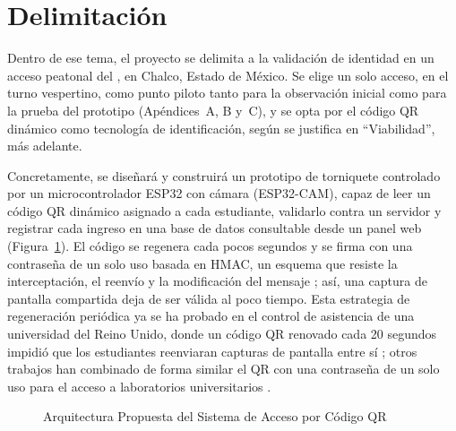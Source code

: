 \section{Delimitación}
Dentro de ese tema, el proyecto se delimita a la validación de identidad en
un acceso peatonal del \tescha{},
en Chalco, Estado de México. Se elige un solo acceso, en el turno vespertino,
como punto piloto tanto para la observación inicial como para la prueba del
prototipo (Apéndices~A, B y~C), y se opta por el código QR dinámico como
tecnología de identificación, según se justifica en ``Viabilidad'', más
adelante.

Concretamente, se diseñará y construirá un prototipo de torniquete
controlado por un microcontrolador ESP32 con cámara (ESP32-CAM), capaz de
leer un código QR dinámico asignado a cada estudiante, validarlo contra un
servidor y registrar cada ingreso en una base de datos consultable desde un
panel web (Figura~\ref{fig:arquitectura}). El código se regenera cada pocos
segundos y se firma con una contraseña de un solo uso basada en HMAC, un
esquema que resiste la interceptación, el reenvío y la modificación del
mensaje \parencite{subpratatsavee2015hmac}; así, una captura de pantalla
compartida deja de ser válida al poco tiempo. Esta estrategia de regeneración
periódica ya se ha probado en el control de asistencia de una universidad del
Reino Unido, donde un código QR renovado cada 20 segundos impidió que los
estudiantes reenviaran capturas de pantalla entre sí
\parencite{nwabuwe2023dynamicqr}; otros trabajos han combinado de forma
similar el QR con una contraseña de un solo uso para el acceso a laboratorios
universitarios \parencite{chaabani2023labqr}.

\begin{figure}[tbp]
	\caption{Arquitectura Propuesta del Sistema de Acceso por Código QR}
	\label{fig:arquitectura}
	\centering
\end{figure}

